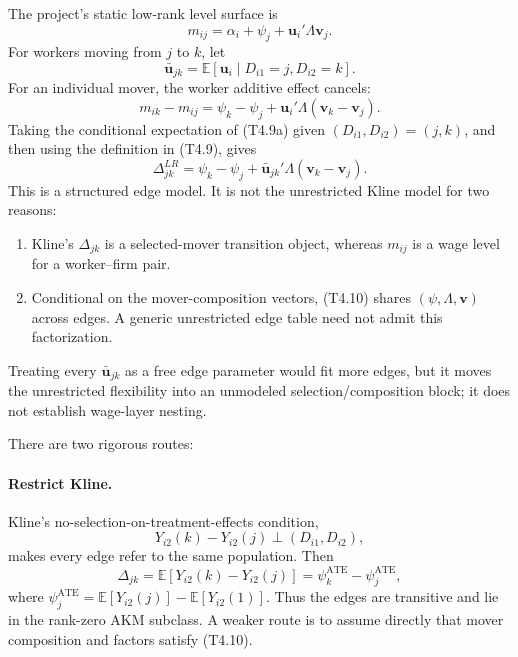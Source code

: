 \documentclass[11pt]{article}
\begin{document}
The project's static low-rank level surface is
\[
m_{ij}
=
\alpha_i+\psi_j+\mathbf u_i'\Lambda\mathbf v_j.
\tag{T4.8}
\]
For workers moving from \(j\) to \(k\), let
\[
\bar{\mathbf u}_{jk}
=
\mathbb E[\mathbf u_i\mid D_{i1}=j,D_{i2}=k].
\tag{T4.9}
\]
For an individual mover, the worker additive effect cancels:
\[
m_{ik}-m_{ij}
=
\psi_k-\psi_j
+\mathbf u_i'\Lambda(\mathbf v_k-\mathbf v_j).
\tag{T4.9a}
\]
Taking the conditional expectation of (T4.9a) given
\((D_{i1},D_{i2})=(j,k)\), and then using the definition in (T4.9), gives
\[
\Delta^{LR}_{jk}
=
\psi_k-\psi_j
+\bar{\mathbf u}_{jk}'\Lambda(\mathbf v_k-\mathbf v_j).
\tag{T4.10}
\]
This is a structured edge model.  It is not the unrestricted Kline model for
two reasons:

\begin{enumerate}
\item Kline's \(\Delta_{jk}\) is a selected-mover transition object, whereas
  \(m_{ij}\) is a wage level for a worker--firm pair.
\item Conditional on the mover-composition vectors, (T4.10) shares
  \((\psi,\Lambda,\mathbf v)\) across edges.  A generic unrestricted edge
  table need not admit this factorization.
\end{enumerate}

Treating every \(\bar{\mathbf u}_{jk}\) as a free edge parameter would fit
more edges, but it moves the unrestricted flexibility into an unmodeled
selection/composition block; it does not establish wage-layer nesting.

There are two rigorous routes:

\paragraph{Restrict Kline.}
Kline's no-selection-on-treatment-effects condition,
\[
Y_{i2}(k)-Y_{i2}(j)\perp(D_{i1},D_{i2}),
\tag{T4.11}
\]
makes every edge refer to the same population.  Then
\[
\Delta_{jk}
=
\mathbb E[Y_{i2}(k)-Y_{i2}(j)]
=
\psi_k^{\mathrm{ATE}}-\psi_j^{\mathrm{ATE}},
\tag{T4.12}
\]
where
\(\psi_j^{\mathrm{ATE}}
=\mathbb E[Y_{i2}(j)]-\mathbb E[Y_{i2}(1)]\).
Thus the edges are transitive and lie in the rank-zero AKM subclass.  A weaker
route is to assume directly that mover composition and factors satisfy
(T4.10).
\end{document}
